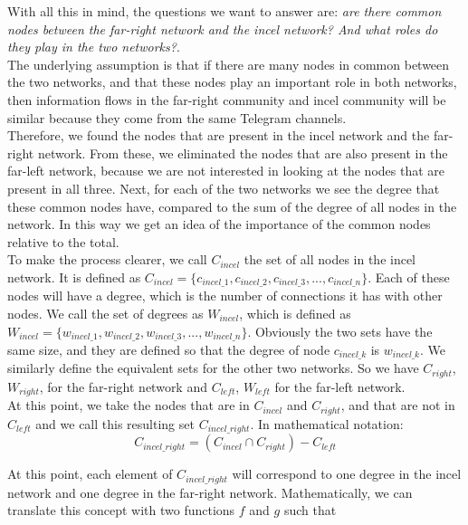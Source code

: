 \documentclass[a4paper,twoside,12pt, openany]{book}
\begin{document}
With all this in mind, the questions we want to answer are: \emph{are there common nodes between the far-right network and the incel network? And what roles do they play in the two networks?}. \\
The underlying assumption is that if there are many nodes in common between the two networks, and that these nodes play an important role in both networks, then information flows in the far-right community and incel community will be similar because they come from the same Telegram channels.\\

Therefore, we found the nodes that are present in the incel network and the far-right network. From these, we eliminated the nodes that are also present in the far-left network, because we are not interested in looking at the nodes that are present in all three. Next, for each of the two networks we see the degree that these common nodes have, compared to the sum of the degree of all nodes in the network. In this way we get an idea of the importance of the common nodes relative to the total. \\
To make the process clearer, we call \(C_{incel}\) the set of all nodes in the incel network. It is defined as \(C_{incel} = \{c_{incel\_1}, c_{incel\_2}, c_{incel\_3},...,c_{incel\_n}\}\). Each of these nodes will have a degree, which is the number of connections it has with other nodes. We call the set of degrees as \(W_{incel}\), which is defined as \(W_{incel} = \{w_{incel\_1}, w_{incel\_2}, w_{incel\_3},...,w_{incel\_n}\}\). Obviously the two sets have the same size, and they are defined so that the degree of node \(c_{incel\_k}\) is \(w_{incel\_k}\). We similarly define the equivalent sets for the other two networks. So we have \(C_{right}\), \(W_{right}\), for the far-right network and  \(C_{left}\), \(W_{left}\) for the far-left network. \\
At this point, we take the nodes that are in \(C_{incel}\) and \(C_{right}\), and that are not in \(C_{left}\) and we call this resulting set \(C_{incel\_right}\). In mathematical notation: 
\begin{displaymath}
	C_{incel\_right} = (C_{incel} \cap C_{right}) - C_{left}
\end{displaymath}


At this point, each element of $C_{incel\_right}$ will correspond to one degree in the incel network and one degree in the far-right network. Mathematically, we can translate this concept with two functions $f$ and $g$ such that 
\end{document}
